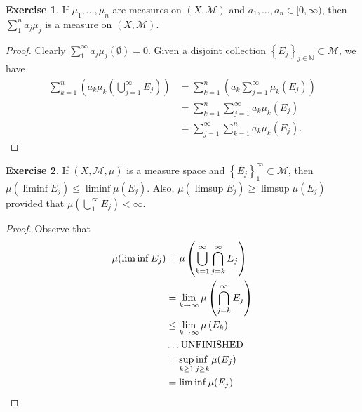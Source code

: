 \documentclass{article}
\theoremstyle{definition}
\newtheorem{ex}{Exercise}
\begin{document}
\begin{ex}
	If $\mu_1, \dots, \mu_n$ are measures on $(X, \mathscr{M})$ and $a_1, \dots, a_n \in [0, \infty)$, then $\sum _{1}^{n}a_j\mu_j$ is a measure on $(X, \mathscr{M})$.
\end{ex}
\begin{proof}
	Clearly $\sum _{1}^{\infty}a_j\mu_j(\emptyset) = 0$.
	Given a disjoint collection $\left\lbrace E_j \right\rbrace_{j \in \mathbb{N}} \subset \mathscr{M}$, we have \begin{align*}
		\sum _{k = 1}^{n} \left( a_k\mu_k \left( \bigcup _{j = 1}^{\infty} E_j \right) \right) & = \sum _{k = 1}^{n} \left( a_k\sum _{j = 1}^{\infty} \mu_k(E_j) \right) \\
		                                                                                       & = \sum _{k = 1}^{n} \sum _{j = 1}^{\infty} a_k\mu_k(E_j)                \\
		                                                                                       & = \sum _{j = 1}^{\infty} \sum _{k = 1}^{n} a_k\mu_k (E_j).
	\end{align*}
\end{proof}

\begin{ex}
	If $(X, \mathscr{M}, \mu)$ is a measure space and $\left\lbrace E_j \right\rbrace _{1}^{\infty} \subset \mathscr{M}$, then $\mu(\liminf E_j) \leq \liminf\mu(E_j)$.
	Also, $\mu(\limsup E_j) \geq \limsup \mu(E_j)$ provided that $\mu(\bigcup _{1}^{\infty}E_j) < \infty$.
\end{ex}
\begin{proof}
	Observe that \begin{align*}
		\mu(\liminf E_j) & = \mu \left( \bigcup _{k = 1}^{\infty} \bigcap _{j = k}^{\infty} E_j \right) \\
		                 & = \lim_{k \to \infty} \mu \left(  \bigcap_{j = k}^\infty E_j \right)         \\
		                 & \leq \lim_{k \to \infty} \mu \left( E_k \right)                              \\
		                 & \dots \mathrm{UNFINISHED}                                                    \\
		                 & = \adjustlimits\sup_{k \geq 1} \inf_{j \geq k} \mu(E_j)                      \\
		                 & = \liminf\mu(E_j)
	\end{align*}
\end{proof}
\end{document}
